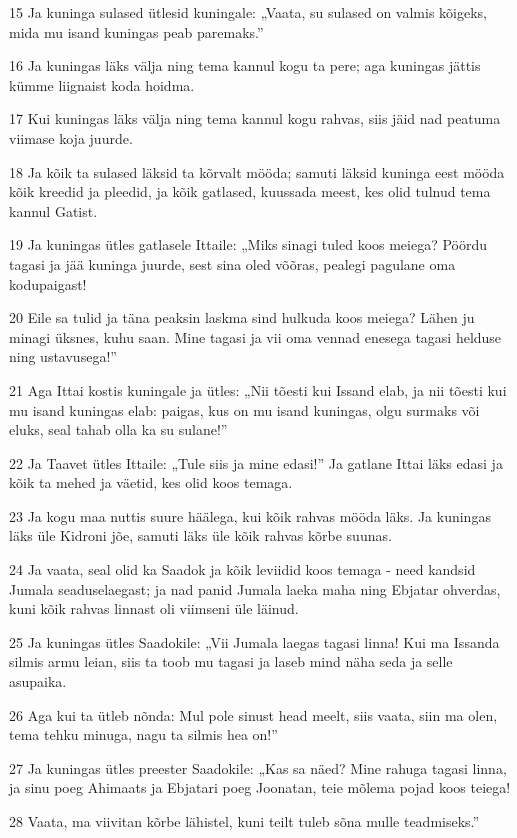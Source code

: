 \par 15 Ja kuninga sulased ütlesid kuningale: „Vaata, su sulased on valmis kõigeks, mida mu isand kuningas peab paremaks.”
\par 16 Ja kuningas läks välja ning tema kannul kogu ta pere; aga kuningas jättis kümme liignaist koda hoidma.
\par 17 Kui kuningas läks välja ning tema kannul kogu rahvas, siis jäid nad peatuma viimase koja juurde.
\par 18 Ja kõik ta sulased läksid ta kõrvalt mööda; samuti läksid kuninga eest mööda kõik kreedid ja pleedid, ja kõik gatlased, kuussada meest, kes olid tulnud tema kannul Gatist.
\par 19 Ja kuningas ütles gatlasele Ittaile: „Miks sinagi tuled koos meiega? Pöördu tagasi ja jää kuninga juurde, sest sina oled võõras, pealegi pagulane oma kodupaigast!
\par 20 Eile sa tulid ja täna peaksin laskma sind hulkuda koos meiega? Lähen ju minagi üksnes, kuhu saan. Mine tagasi ja vii oma vennad enesega tagasi helduse ning ustavusega!”
\par 21 Aga Ittai kostis kuningale ja ütles: „Nii tõesti kui Issand elab, ja nii tõesti kui mu isand kuningas elab: paigas, kus on mu isand kuningas, olgu surmaks või eluks, seal tahab olla ka su sulane!”
\par 22 Ja Taavet ütles Ittaile: „Tule siis ja mine edasi!” Ja gatlane Ittai läks edasi ja kõik ta mehed ja väetid, kes olid koos temaga.
\par 23 Ja kogu maa nuttis suure häälega, kui kõik rahvas mööda läks. Ja kuningas läks üle Kidroni jõe, samuti läks üle kõik rahvas kõrbe suunas.
\par 24 Ja vaata, seal olid ka Saadok ja kõik leviidid koos temaga - need kandsid Jumala seaduselaegast; ja nad panid Jumala laeka maha ning Ebjatar ohverdas, kuni kõik rahvas linnast oli viimseni üle läinud.
\par 25 Ja kuningas ütles Saadokile: „Vii Jumala laegas tagasi linna! Kui ma Issanda silmis armu leian, siis ta toob mu tagasi ja laseb mind näha seda ja selle asupaika.
\par 26 Aga kui ta ütleb nõnda: Mul pole sinust head meelt, siis vaata, siin ma olen, tema tehku minuga, nagu ta silmis hea on!”
\par 27 Ja kuningas ütles preester Saadokile: „Kas sa näed? Mine rahuga tagasi linna, ja sinu poeg Ahimaats ja Ebjatari poeg Joonatan, teie mõlema pojad koos teiega!
\par 28 Vaata, ma viivitan kõrbe lähistel, kuni teilt tuleb sõna mulle teadmiseks.”
